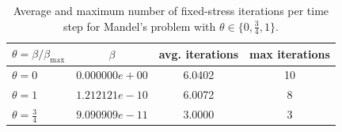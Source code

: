 \begin{table}[ht!]
\centering
\begin{tabular}{lccc}
\hline
$\theta = \beta/\beta_{\max}$ & $\beta$ & avg. iterations & max iterations \\
\hline
$\theta = 0$ & $0.000000e+00$ & 6.0402 & 10 \\
$\theta = 1$ & $1.212121e-10$ & 6.0072 & 8 \\
$\theta = \tfrac{3}{4}$ & $9.090909e-11$ & 3.0000 & 3 \\
\hline
\end{tabular}
\caption{Average and maximum number of fixed-stress iterations per time step for Mandel's problem with $\theta \in \{0, \tfrac{3}{4}, 1\}$.}
\label{tab:mandel_iteration_summary}
\end{table}